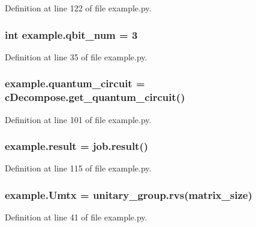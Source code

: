 Definition at line 122 of file example.\+py.

\subsubsection[{\texorpdfstring{qbit\+\_\+num}{qbit_num}}]{\setlength{\rightskip}{0pt plus 5cm}int example.\+qbit\+\_\+num = 3}\hypertarget{namespaceexample_aedf2ea7d5e512f6db84a19d73dbd5305}{}\label{namespaceexample_aedf2ea7d5e512f6db84a19d73dbd5305}


Definition at line 35 of file example.\+py.

\subsubsection[{\texorpdfstring{quantum\+\_\+circuit}{quantum_circuit}}]{\setlength{\rightskip}{0pt plus 5cm}example.\+quantum\+\_\+circuit = c\+Decompose.\+get\+\_\+quantum\+\_\+circuit()}\hypertarget{namespaceexample_a1602c6a1a270f94e2c254b3b6501cd86}{}\label{namespaceexample_a1602c6a1a270f94e2c254b3b6501cd86}


Definition at line 101 of file example.\+py.

\subsubsection[{\texorpdfstring{result}{result}}]{\setlength{\rightskip}{0pt plus 5cm}example.\+result = job.\+result()}\hypertarget{namespaceexample_ae9f7cf9f0786fe88c5590ca4ad5a295a}{}\label{namespaceexample_ae9f7cf9f0786fe88c5590ca4ad5a295a}


Definition at line 115 of file example.\+py.

\subsubsection[{\texorpdfstring{Umtx}{Umtx}}]{\setlength{\rightskip}{0pt plus 5cm}example.\+Umtx = unitary\+\_\+group.\+rvs({\bf matrix\+\_\+size})}\hypertarget{namespaceexample_a9f6bbbedb3a0154f9a0199a632198b9f}{}\label{namespaceexample_a9f6bbbedb3a0154f9a0199a632198b9f}


Definition at line 41 of file example.\+py.

